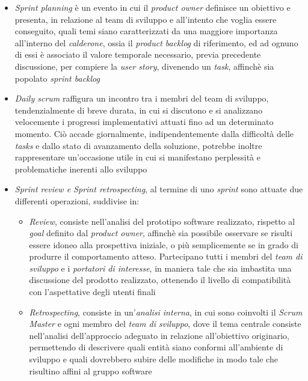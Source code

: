 \documentclass{article}
\begin{document}
\begin{itemize}[label={-}]
    \itemsep0em
    \item \textit{Sprint planning} è un evento in cui il \textit{product owner} definisce un obiettivo e presenta, in relazione al team di sviluppo e all'intento che voglia essere conseguito, quali temi siano caratterizzati da una maggiore importanza all'interno del \textit{calderone}, ossia il \textit{product backlog} di riferimento, ed ad ognuno di essi è associato il valore temporale necessario, previa precedente discussione, per compiere la \textit{user story}, divenendo un \textit{task}, affinchè sia popolato \textit{sprint backlog}
    \item \textit{Daily scrum} raffigura un incontro tra i membri del team di sviluppo, tendenzialmente di breve durata, in cui si discutono e si analizzano velocemente i progressi implementativi attuati fino ad un determinato momento. Ciò accade giornalmente, indipendentemente dalla difficoltà delle \textit{tasks} e dallo stato di avanzamento della soluzione, potrebbe inoltre rappresentare un'occasione utile in cui si manifestano perplessità e problematiche inerenti allo sviluppo 
    \item \textit{Sprint review e Sprint retrospecting}, al termine di uno \textit{sprint} sono attuate due differenti operazioni, suddivise in: \begin{itemize}[label={-}]
                                                                                                                                                    \itemsep0em
                                                                                                                                                    \item \textit{Review}, consiste nell'analisi del prototipo software realizzato, rispetto al \textit{goal} definito dal \textit{product owner}, affinchè sia possibile osservare se risulti essere idoneo alla prospettiva iniziale, o più semplicemente se in grado di produrre il comportamento atteso. Partecipano tutti i membri del \textit{team di sviluppo} e i \textit{portatori di interesse}, in maniera tale che sia imbastita una discussione del prodotto realizzato, ottenendo il livello di compatibilità con l'aspettative degli utenti finali
                                                                                                                                            \item \textit{Retrospecting}, consiste in un'\textit{analisi interna}, in cui sono coinvolti il \textit{Scrum Master} e ogni membro del \textit{team di sviluppo}, dove il tema centrale consiste nell'analisi dell'approccio adeguato in relazione all'obiettivo originario, permettendo di descrivere quali entità siano conformi all'ambiente di sviluppo e quali dovrebbero subire delle modifiche in modo tale che risultino affini al gruppo software
                                                                                                                                                \end{itemize}
\end{itemize}
\end{document}
